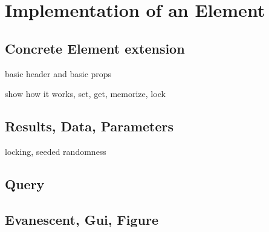 \documentclass{tufte-handout}
\begin{document}
\section{Implementation of an Element}

\subsection{Concrete Element extension}

basic header and basic props

show how it works, set, get, memorize, lock

\subsection{Results, Data, Parameters}

locking, seeded randomness

\subsection{Query}

\subsection{Evanescent, Gui, Figure}

%
%
\end{document}
